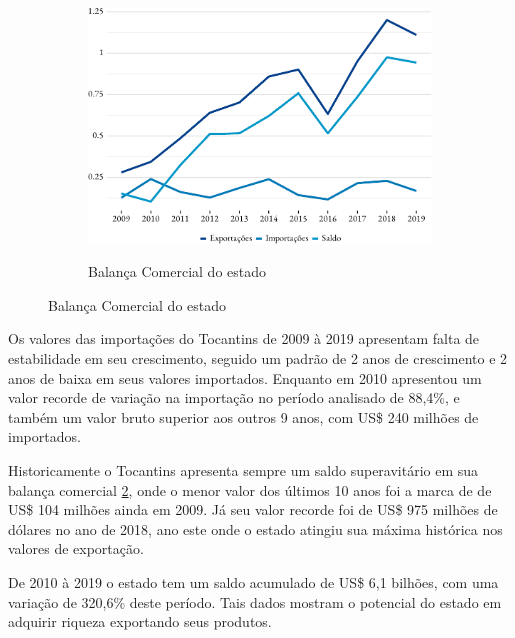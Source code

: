 \begin{figure}[!h]
		\begin{subfigure}{\linewidth}
		\caption{Balança Comercial do estado}
		\includegraphics{fig/total-1.pdf}
		\label{fig:balanca}
	\end{subfigure}
\end{figure}


\par Os valores das importações do Tocantins de 2009 à 2019 apresentam falta de estabilidade em seu crescimento, seguido um padrão de 2 anos de crescimento e 2 anos de baixa em seus valores importados. Enquanto em 2010 apresentou um valor recorde de variação na importação no período analisado de 88,4\%, e também um valor bruto superior aos outros 9 anos, com US\$ 240 milhões de importados.

\par Historicamente o Tocantins apresenta sempre um saldo superavitário em sua balança comercial \ref{fig:balanca}, onde o menor valor dos últimos 10 anos foi a marca de de US\$ 104 milhões ainda em 2009. Já seu valor recorde foi de US\$ 975 milhões de dólares no ano de 2018, ano este onde o estado atingiu sua máxima histórica nos valores de exportação.

\par De 2010 à 2019 o estado tem um saldo acumulado de US\$ 6,1 bilhões, com uma variação de 320,6\% deste período. Tais dados mostram o potencial do estado em adquirir riqueza exportando seus produtos.

